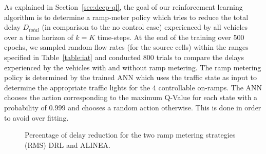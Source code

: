 \documentclass[conference]{IEEEtran}
\begin{document}
As explained in Section~\ref{sec:deep-ql}, the goal of our reinforcement learning algorithm is to determine a ramp-meter policy which tries to reduce the total delay $D_{total}$ (in comparison to the no control case) experienced by all vehicles over a time horizon of $k=K$ time-steps. At the end of the training over 500 epochs, we sampled random flow rates (for the source cells) within the ranges specified in Table~\ref{table:iat} and conducted $800$ trials to compare the delays experienced by the vehicles with and without ramp metering. The ramp metering policy is determined by the trained \ac{ANN} which uses the traffic state as input to determine the appropriate traffic lights for the $4$ controllable on-ramps. The \ac{ANN} chooses the action corresponding to the maximum Q-Value for each state with a probability of $0.999$ and chooses a random action otherwise. This is done in order to avoid over fitting.


\begin{figure}[!htbp]
	
	\hfill%
	\hfill%
	\caption{Percentage of delay reduction for the two ramp metering strategies (RMS) DRL and ALINEA.}
	\label{fig:delays}
\end{figure} 
\end{document}
